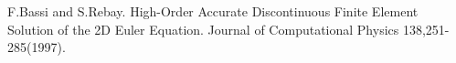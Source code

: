 
\begin{publications}{99}

\item F.Bassi and S.Rebay.
  High-Order Accurate Discontinuous Finite Element Solution of the 2D Euler Equation.
  Journal of Computational Physics 138,251-285(1997).


\end{publications}
